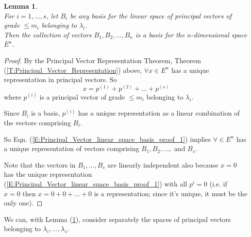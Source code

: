 \documentclass[twoside]{amsart}
\theoremstyle{plain}
\newtheorem{lemma}{Lemma}
\theoremstyle{definition}
\begin{document}
\begin{lemma}\label{L:Principal_vector_linear_space_basis} \quad \\
For $i=1, \dots , s$, let $B_i$ be any basis for the linear space of principal vectors of grade $\leq m_i$ belonging to $\lambda_i$.  \\
Then the collection of vectors $B_1, B_2, \dots , B_n$ is a basis for the $n$-dimensional space $E^n$.  
\end{lemma}
\begin{proof}
By the Principal Vector Representation Theorem, Theorem (\ref{T:Principal_Vector_Representation}) above, 
\phantom{ By the} $\forall x \in E^n$ has a unique representation in principal vectors.  So
\begin{equation}\label{E:Principal_Vector_linear_space_basis_proof_1}
x = p^{(1)} + p^{(2)} + \dots + p^{(s)}
\end{equation}
where $p^{(i)}$ is a principal vector of grade $\leq m_i$ belonging to $\lambda_i$.  

Since $B_i$ is a basis, $p^{(i)}$ has a unique representation as a linear combination of the vectors comprising $B_i$.

So Eqn. (\ref{E:Principal_Vector_linear_space_basis_proof_1}) implies $\forall \in E^n$ has a unique representation of vectors comprising $B_1,B_2,\dots, \text{ and } B_s$.  

Note that the vectors in $B_1, \dots , B_s$ are linearly independent also because $x =0 $ has the unique representation (\ref{E:Principal_Vector_linear_space_basis_proof_1}) with all $p^i = 0$ (i.e. if $x =0 \text{ then } x =0 + 0 + \dots + 0$ is a representation; since it's unique, it must be the only one).   
\end{proof}

We can, with Lemma (\ref{L:Principal_vector_linear_space_basis}), consider separately the spaces of principal vectors belonging to $\lambda_i, \dots ,\lambda_s$.  
\end{document}
